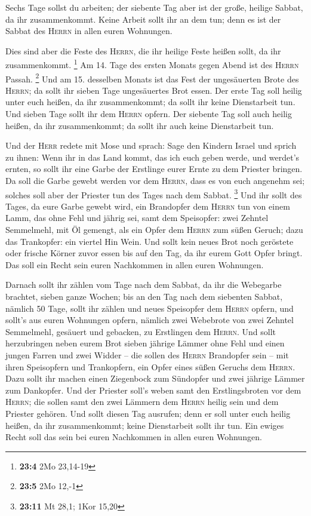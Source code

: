  Sechs Tage sollst du arbeiten; der siebente Tag aber ist
der große, heilige Sabbat, da ihr zusammenkommt. Keine Arbeit sollt ihr
an dem tun; denn es ist der Sabbat des \textsc{Herrn} in allen euren
Wohnungen.

 Dies sind aber die Feste des \textsc{Herrn}, die ihr
heilige Feste heißen sollt, da ihr zusammenkommt. \footnote{\textbf{23:4}
  2Mo 23,14-19}  Am 14. Tage des ersten Monats gegen Abend
ist des \textsc{Herrn} Passah. \footnote{\textbf{23:5} 2Mo 12,-1}
 Und am 15. desselben Monats ist das Fest der ungesäuerten
Brote des \textsc{Herrn}; da sollt ihr sieben Tage ungesäuertes Brot
essen.  Der erste Tag soll heilig unter euch heißen, da
ihr zusammenkommt; da sollt ihr keine Dienstarbeit tun. 
Und sieben Tage sollt ihr dem \textsc{Herrn} opfern. Der siebente Tag
soll auch heilig heißen, da ihr zusammenkommt; da sollt ihr auch keine
Dienstarbeit tun.

 Und der \textsc{Herr} redete mit Mose und sprach:
 Sage den Kindern Israel und sprich zu ihnen: Wenn ihr in
das Land kommt, das ich euch geben werde, und werdet's ernten, so sollt
ihr eine Garbe der Erstlinge eurer Ernte zu dem Priester bringen.
 Da soll die Garbe gewebt werden vor dem \textsc{Herrn},
dass es von euch angenehm sei; solches soll aber der Priester tun des
Tages nach dem Sabbat. \footnote{\textbf{23:11} Mt 28,1; 1Kor 15,20}
 Und ihr sollt des Tages, da eure Garbe gewebt wird, ein
Brandopfer dem \textsc{Herrn} tun von einem Lamm, das ohne Fehl und
jährig sei,  samt dem Speisopfer: zwei Zehntel
Semmelmehl, mit Öl gemengt, als ein Opfer dem \textsc{Herrn} zum süßen
Geruch; dazu das Trankopfer: ein viertel Hin Wein.  Und
sollt kein neues Brot noch geröstete oder frische Körner zuvor essen bis
auf den Tag, da ihr eurem Gott Opfer bringt. Das soll ein Recht sein
euren Nachkommen in allen euren Wohnungen.

 Darnach sollt ihr zählen vom Tage nach dem Sabbat, da
ihr die Webegarbe brachtet, sieben ganze Wochen;  bis an
den Tag nach dem siebenten Sabbat, nämlich 50 Tage, sollt ihr zählen und
neues Speisopfer dem \textsc{Herrn} opfern,  und sollt's
aus euren Wohnungen opfern, nämlich zwei Webebrote von zwei Zehntel
Semmelmehl, gesäuert und gebacken, zu Erstlingen dem \textsc{Herrn}.
 Und sollt herzubringen neben eurem Brot sieben jährige
Lämmer ohne Fehl und einen jungen Farren und zwei Widder -- die sollen
des \textsc{Herrn} Brandopfer sein -- mit ihren Speisopfern und
Trankopfern, ein Opfer eines süßen Geruchs dem \textsc{Herrn}.
 Dazu sollt ihr machen einen Ziegenbock zum Sündopfer und
zwei jährige Lämmer zum Dankopfer.  Und der Priester
soll's weben samt den Erstlingsbroten vor dem \textsc{Herrn}; die sollen
samt den zwei Lämmern dem \textsc{Herrn} heilig sein und dem Priester
gehören.  Und sollt diesen Tag ausrufen; denn er soll
unter euch heilig heißen, da ihr zusammenkommt; keine Dienstarbeit sollt
ihr tun. Ein ewiges Recht soll das sein bei euren Nachkommen in allen
euren Wohnungen.

